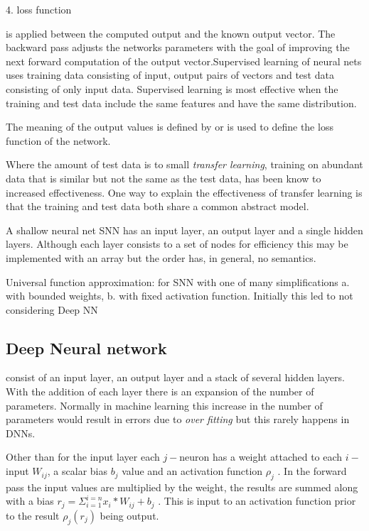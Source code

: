 \vspace{1mm}\begin{center}\begin{minipage}{2in} 4.  loss function \end{minipage}\end{center}

\noindent is applied between the computed output and the known output vector. The backward pass adjusts the networks parameters with the goal of improving the next forward computation of the output vector.Supervised learning of neural nets uses training data consisting of input, output pairs of vectors and test data consisting of only input data. Supervised learning is most effective when the training and test data include the same features and have the same distribution. 

The meaning of the output values is defined by or is used to define the loss function of the network.

Where the amount of test data is to small \emph{transfer learning}, training on abundant data that is similar but not the same as the test data, has been know to increased effectiveness. 
 One way to explain the effectiveness of  transfer learning is that the training and test data   both share   a common abstract  model.
 
A shallow neural net SNN has  an input layer, an output layer and a single hidden layers.
Although each layer consists to a set of nodes for efficiency this may be implemented with an array but the order has, in general, no semantics.
 
 Universal function approximation: for SNN with one of many simplifications a. with bounded weights, b. with fixed activation function. Initially this led to not considering Deep NN



\subsection{Deep Neural network} consist of an input layer, an output layer and a stack of several hidden layers.  With the addition of each layer there is an expansion of the number of parameters. Normally in machine learning this increase in the number of parameters would result in errors due to \emph{over fitting} but this rarely happens in DNNs. 


Other than for the input layer each $j-$neuron has a weight attached to each $i-$input $W_{ij}$, a scalar bias $b_j$ value and an activation function $\rho_j$ .
In the  forward pass the input values  are multiplied by the weight, the results are summed along with a bias  $r_j=\Sigma_{i=1}^{i=n} x_i*W_{ij} + b_j$ . This is input to an activation function prior to the result $\rho_j(r_j)$  being output. 

